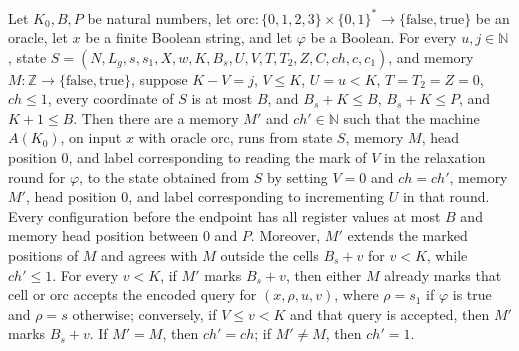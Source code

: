 \begin{theorem}
\label{Complexity.LogProg.ExpBFS.inner_run}
\leanok
{}
Let $K_0,B,P$ be natural numbers, let
$\mathrm{orc}:\{0,1,2,3\}\times\{0,1\}^*\to\{\mathrm{false},\mathrm{true}\}$ be an
oracle, let $x$ be a finite Boolean string, and let $\varphi$ be a Boolean. For every
$u,j\in\mathbb N$, state $S=(N,L_g,s,s_1,X,w,K,B_s,U,V,T,T_2,Z,C,ch,c,c_1)$, and memory
$M:\mathbb Z\to\{\mathrm{false},\mathrm{true}\}$, suppose $K-V=j$, $V\le K$, $U=u<K$,
$T=T_2=Z=0$, $ch\le1$, every coordinate of $S$ is at most $B$, and $B_s+K\le B$,
$B_s+K\le P$, and $K+1\le B$. Then there are a memory $M'$ and $ch'\in\mathbb N$ such
that the machine $A(K_0)$, on input $x$ with oracle $\mathrm{orc}$, runs from state $S$,
memory $M$, head position $0$, and label corresponding to reading the mark of $V$ in the
relaxation round for $\varphi$, to the state obtained from $S$ by setting $V=0$ and
$ch=ch'$, memory $M'$, head position $0$, and label corresponding to incrementing $U$ in
that round. Every configuration before the endpoint has all register values at most $B$
and memory head position between $0$ and $P$. Moreover, $M'$ extends the marked
positions of $M$ and agrees with $M$ outside the cells $B_s+v$ for $v<K$, while
$ch'\le1$. For every $v<K$, if $M'$ marks $B_s+v$, then either $M$ already marks that
cell or $\mathrm{orc}$ accepts the encoded query for $(x,\rho,u,v)$, where $\rho=s_1$ if
$\varphi$ is true and $\rho=s$ otherwise; conversely, if $V\le v<K$ and that query is
accepted, then $M'$ marks $B_s+v$. If $M'=M$, then $ch'=ch$; if $M'\ne M$, then $ch'=1$.
\end{theorem}

